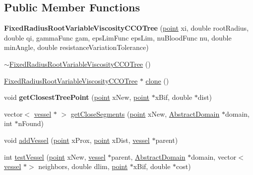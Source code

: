 \subsection*{Public Member Functions}
\begin{DoxyCompactItemize}
\item 
\mbox{\label{class_fixed_radius_root_variable_viscosity_c_c_o_tree_a7e22b5dfef66e92384c751b7911a84ab}} 
{\bfseries Fixed\+Radius\+Root\+Variable\+Viscosity\+C\+C\+O\+Tree} (\mbox{\hyperlink{structpoint}{point}} xi, double root\+Radius, double qi, gamma\+Func gam, eps\+Lim\+Func eps\+Lim, nu\+Blood\+Func nu, double min\+Angle, double resistance\+Variation\+Tolerance)
\item 
\mbox{\hyperlink{class_fixed_radius_root_variable_viscosity_c_c_o_tree_a4c0d8b01e34db22d79faf4b4906e3c06}{$\sim$\+Fixed\+Radius\+Root\+Variable\+Viscosity\+C\+C\+O\+Tree}} ()
\item 
\mbox{\hyperlink{class_fixed_radius_root_variable_viscosity_c_c_o_tree}{Fixed\+Radius\+Root\+Variable\+Viscosity\+C\+C\+O\+Tree}} $\ast$ \mbox{\hyperlink{class_fixed_radius_root_variable_viscosity_c_c_o_tree_a0389e2b36c990dfa2cce140bc186b1f5}{clone}} ()
\item 
\mbox{\label{class_fixed_radius_root_variable_viscosity_c_c_o_tree_aa3f90cff4eb94084830cf3fbabe8023b}} 
void {\bfseries get\+Closest\+Tree\+Point} (\mbox{\hyperlink{structpoint}{point}} x\+New, \mbox{\hyperlink{structpoint}{point}} $\ast$x\+Bif, double $\ast$dist)
\item 
vector$<$ \mbox{\hyperlink{structvessel}{vessel}} $\ast$ $>$ \mbox{\hyperlink{class_fixed_radius_root_variable_viscosity_c_c_o_tree_ae7a54cd9971cea1ed9b94e2c5f874e78}{get\+Close\+Segments}} (\mbox{\hyperlink{structpoint}{point}} x\+New, \mbox{\hyperlink{class_abstract_domain}{Abstract\+Domain}} $\ast$domain, int $\ast$n\+Found)
\item 
void \mbox{\hyperlink{class_fixed_radius_root_variable_viscosity_c_c_o_tree_a76edd9c8900d98ee4748c6449fe68a9e}{add\+Vessel}} (\mbox{\hyperlink{structpoint}{point}} x\+Prox, \mbox{\hyperlink{structpoint}{point}} x\+Dist, \mbox{\hyperlink{structvessel}{vessel}} $\ast$parent)
\item 
int \mbox{\hyperlink{class_fixed_radius_root_variable_viscosity_c_c_o_tree_ac2216604fbfd0a9e532cb01153a36af6}{test\+Vessel}} (\mbox{\hyperlink{structpoint}{point}} x\+New, \mbox{\hyperlink{structvessel}{vessel}} $\ast$parent, \mbox{\hyperlink{class_abstract_domain}{Abstract\+Domain}} $\ast$domain, vector$<$ \mbox{\hyperlink{structvessel}{vessel}} $\ast$$>$ neighbors, double dlim, \mbox{\hyperlink{structpoint}{point}} $\ast$x\+Bif, double $\ast$cost)
$$
\end{DoxyCompactItemize}
